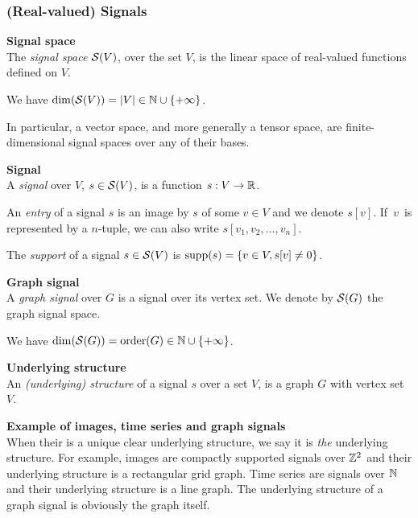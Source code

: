 \subsubsection{(Real-valued) Signals}

\begin{definition}\textbf{Signal space}\\
The \emph{signal space} $\mathcal{S}(V)$, over the set $V$, is the linear space of real-valued functions defined on $V$.
\end{definition}

We have $\dim(\mathcal{S}(V)) = |V| \in \mathbb{N} \cup \{+\infty\}$.

\begin{remark}
In particular, a vector space, and more generally a tensor space, are finite-dimensional signal spaces over any of their bases.
\end{remark}

\begin{definition}\textbf{Signal}\\
A \emph{signal} over $V$, $s \in \mathcal{S}(V)$, is a function $s: V \rightarrow \mathbb{R}$.

An \emph{entry} of a signal $s$ is an image by $s$ of some $v \in V$ and we denote $s[v]$. If~$v$~is represented by a $n$-tuple, we can also write $s[v_1, v_2, \ldots, v_n]$.

The \emph{support} of a signal $s \in \mathcal{S}(V)$ is $\operatorname{supp}(s) = \{ v \in V, s[v] \neq 0 \}$.
\end{definition}

\begin{definition}\textbf{Graph signal}\\ 
A \emph{graph signal} over $G$ is a signal over its vertex set. We denote by $\mathcal{S}(G)$ the graph signal space.
\end{definition}

We have $\dim(\mathcal{S}(G)) = \operatorname{order}(G) \in \mathbb{N} \cup \{+\infty\}$.

\begin{definition}\textbf{Underlying structure}\\
An \emph{(underlying) structure} of a signal $s$ over a set $V$, is a graph $G$ with vertex set $V$.
\end{definition}

\begin{remark}\textbf{Example of images, time series and graph signals}\\
When their is a unique clear underlying structure, we say it is \emph{the} underlying structure. For example, images are compactly supported signals over $\mathbb{Z}^2$ and their underlying structure is a rectangular grid graph. Time series are signals over $\mathbb{N}$ and their underlying structure is a line graph. The underlying structure of a graph signal is obviously the graph itself.
\end{remark}

